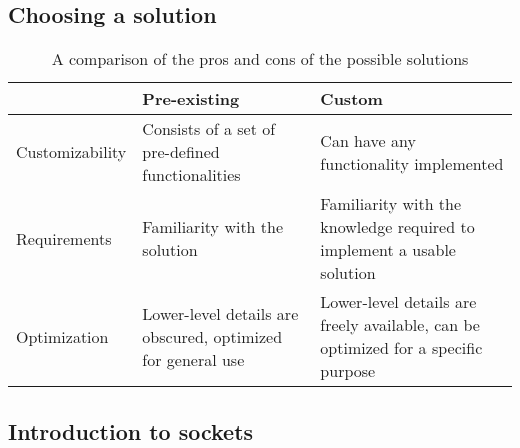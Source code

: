 \subsection{Choosing a solution}
\begin{table}[]
    \begin{tabular}{|l|l|l|}
    \hline
                    & Pre-existing                                                & Custom                                                                            \\ \hline
    Customizability & Consists of a set of pre-defined functionalities            & Can have any functionality implemented                                            \\ \hline
    Requirements    & Familiarity with the solution                               & Familiarity with the knowledge required to implement a usable solution            \\ \hline
    Optimization    & Lower-level details are obscured, optimized for general use & Lower-level details are freely available, can be optimized for a specific purpose \\ \hline
    \end{tabular}
    \caption{A comparison of the pros and cons of the possible solutions}
    \label{tab:networksolprosandcons}
    \end{table}

\subsection{Introduction to sockets}

